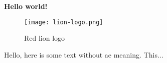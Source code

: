 \documentclass[../main.tex]{subfiles}
\begin{document}
\textbf{Hello world!}

\begin{figure}[bh]
\centering
\texttt{[image: lion-logo.png]}

\label{fig:img1}
\caption{Red lion logo}
\end{figure}

Hello, here is some text without ae meaning.  This... 
\end{document}
